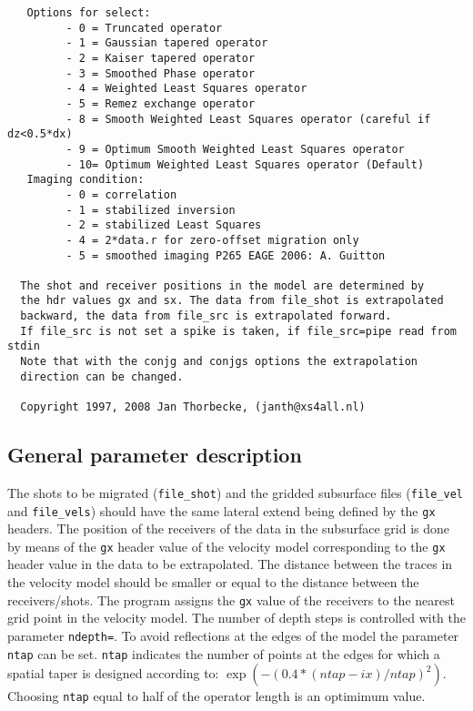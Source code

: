 {\begin{verbatim}
   Options for select:
         - 0 = Truncated operator
         - 1 = Gaussian tapered operator
         - 2 = Kaiser tapered operator
         - 3 = Smoothed Phase operator
         - 4 = Weighted Least Squares operator
         - 5 = Remez exchange operator
         - 8 = Smooth Weighted Least Squares operator (careful if dz<0.5*dx)
         - 9 = Optimum Smooth Weighted Least Squares operator
         - 10= Optimum Weighted Least Squares operator (Default)
   Imaging condition:
         - 0 = correlation
         - 1 = stabilized inversion
         - 2 = stabilized Least Squares
         - 4 = 2*data.r for zero-offset migration only
         - 5 = smoothed imaging P265 EAGE 2006: A. Guitton
 
  The shot and receiver positions in the model are determined by
  the hdr values gx and sx. The data from file_shot is extrapolated 
  backward, the data from file_src is extrapolated forward.
  If file_src is not set a spike is taken, if file_src=pipe read from stdin
  Note that with the conjg and conjgs options the extrapolation 
  direction can be changed.
 
  Copyright 1997, 2008 Jan Thorbecke, (janth@xs4all.nl) 

\end{verbatim}}

\subsection{General parameter description}

The shots to be migrated ({\tt file\_shot}) and the gridded subsurface files ({\tt file\_vel} and {\tt file\_vels}) should have the same lateral extend being defined by the {\tt gx} headers.  The position of the receivers of the data in the subsurface grid is done by means of the {\tt gx} header value of the velocity model corresponding to the {\tt gx} header value in the data to be extrapolated. The distance between the traces in the velocity model should be smaller or equal to the distance between the receivers/shots. The program assigns the {\tt gx} value of the receivers to the nearest grid point in the velocity model. The number of depth steps is controlled with the parameter {\tt ndepth=}. To avoid reflections at the edges of the model the parameter {\tt ntap} can be set. {\tt ntap} indicates the number of points at the edges for which a spatial taper is designed according to: $\exp{(-(0.4*(ntap-ix)/ntap)^2)}$. Choosing {\tt ntap} equal to half of the operator length is an optimimum value. 
 
